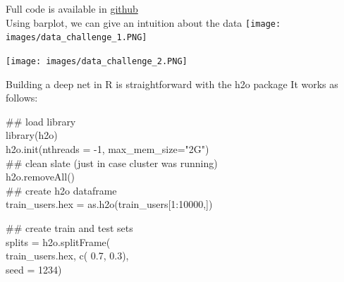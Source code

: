 \documentclass{beamer}
\begin{document}
\begin{frame}
Full code is available in 
 \href{https://github.com/ericbenhamou/BayesianNonParametric}{github}
\\
Using barplot, we can give an intuition about the data
\texttt{[image: images/data\_challenge\_1.PNG]} 
\end{frame}

\begin{frame}
\texttt{[image: images/data\_challenge\_2.PNG]} 
\end{frame}

\begin{frame}
Building a deep net in R is straightforward with the h2o package
It works as follows: \\
\bigskip

{\color{applegreen}  \#\# load library } \\
{\color{blue} library}(h2o) \\
h2o.init(nthreads = -1, max\_mem\_size="2G") \\
{\color{applegreen}  \#\# clean slate (just in case cluster was running) } \\
h2o.removeAll() \\
{\color{applegreen}  \#\# create h2o dataframe } \\
train\_users.hex = as.h2o(train\_users[1:10000,]) 

{\color{applegreen}  \#\# create train and test sets} \\
splits = h2o.splitFrame( \\
\hspace{0.5cm}  train\_users.hex,    c({\color{blue} 0.7},{\color{blue} 0.3}), \\
\hspace{0.5cm}  seed = {\color{blue} 1234})   
\end{frame}
\end{document}
